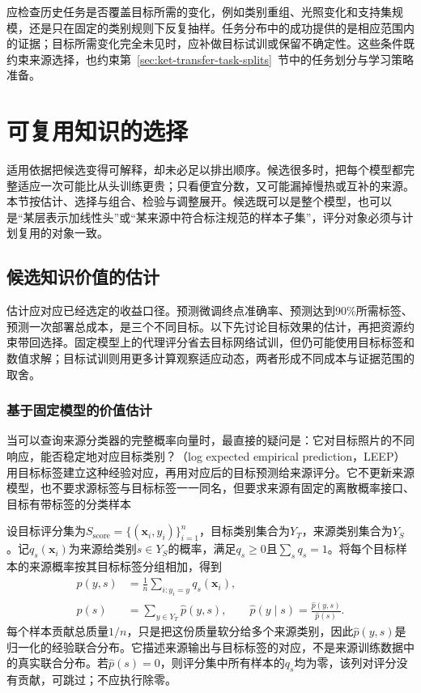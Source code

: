 应检查历史任务是否覆盖目标所需的变化，例如类别重组、光照变化和支持集规模，还是只在固定的类别规则下反复抽样。任务分布中的成功提供的是相应范围内的证据；目标所需变化完全未见时，应补做目标试训或保留不确定性。这些条件既约束来源选择，也约束第~\ref{sec:ket-transfer-task-splits}~节中的任务划分与学习策略准备。

\section{可复用知识的选择}
\label{sec:ket-reuse-selection}

适用依据把候选变得可解释，却未必足以排出顺序。候选很多时，把每个模型都完整适应一次可能比从头训练更贵；只看便宜分数，又可能漏掉慢热或互补的来源。本节按估计、选择与组合、检验与调整展开。候选既可以是整个模型，也可以是“某层表示加线性头”或“某来源中符合标注规范的样本子集”，评分对象必须与计划复用的对象一致。

\subsection{候选知识价值的估计}
\label{sec:ket-reuse-value-estimation}

估计应对应已经选定的收益口径。预测微调终点准确率、预测达到90\%所需标签、预测一次部署总成本，是三个不同目标。以下先讨论目标效果的估计，再把资源约束带回选择。固定模型上的代理评分省去目标网络试训，但仍可能使用目标标签和数值求解；目标试训则用更多计算观察适应动态，两者形成不同成本与证据范围的取舍。

\subsubsection{基于固定模型的价值估计}
\label{sec:ket-reuse-fixed-score}

当可以查询来源分类器的完整概率向量时，最直接的疑问是：它对目标照片的不同响应，能否稳定地对应目标类别？（log expected empirical prediction，LEEP）用目标标签建立这种经验对应，再用对应后的目标预测给来源评分。它不更新来源模型，也不要求源标签与目标标签一一同名，但要求来源有固定的离散概率接口、目标有带标签的分类样本

设目标评分集为$S_{\mathrm{score}}=\{(\bm x_i,y_i)\}_{i=1}^{n}$，目标类别集合为$Y_T$，来源类别集合为$Y_S$。记$q_s(\bm x_i)$为来源给类别$s\in Y_S$的概率，满足$q_s\geq0$且$\sum_s q_s=1$。将每个目标样本的来源概率按其目标标签分组相加，得到
\begin{equation}
  \begin{aligned}
    \hat p(y,s)&=\frac1n\sum_{i:y_i=y}q_s(\bm x_i),\\
    \hat p(s)&=\sum_{y\in Y_T}\hat p(y,s),\qquad
    \hat p(y\mid s)=\frac{\hat p(y,s)}{\hat p(s)}.
  \end{aligned}
  \label{eq:ket-reuse-leep-joint}
\end{equation}
每个样本贡献总质量$1/n$，只是把这份质量软分给多个来源类别，因此$\hat p(y,s)$是归一化的经验联合分布。它描述来源输出与目标标签的对应，不是来源训练数据中的真实联合分布。若$\hat p(s)=0$，则评分集中所有样本的$q_s$均为零，该列对评分没有贡献，可跳过；不应执行除零。

